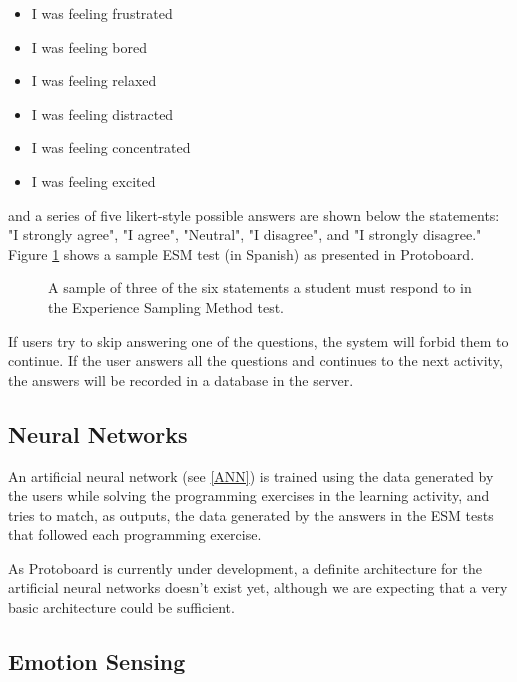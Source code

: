 \documentclass{acm_proc_article-sp}
\begin{document}
\begin{itemize}
  \item I was feeling frustrated
  \item I was feeling bored
  \item I was feeling relaxed
  \item I was feeling distracted
  \item I was feeling concentrated
  \item I was feeling excited
\end{itemize}

and a series of five likert-style possible answers are shown below the
statements: "I strongly agree", "I agree", "Neutral", "I disagree",
and "I strongly disagree." Figure \ref{fig:ESM-test} shows a sample
ESM test (in Spanish) as presented in Protoboard.

\begin{figure}
  \centering
  \caption{A sample of three of the six statements a student must
    respond to in the Experience Sampling Method test.}
  \label{fig:ESM-test}
\end{figure}

If users try to skip answering one of the questions, the system
will forbid them to continue. If the user answers all the questions
and continues to the next activity, the answers will be recorded in a
database in the server.


\subsection{Neural Networks}

An artificial neural network (see \ref{ANN}) is trained using the data generated
by the users while solving the programming exercises in the learning
activity, and tries to match, as outputs, the data generated by the
answers in the ESM tests that followed each programming exercise.

As Protoboard is currently under development, a definite architecture
for the artificial neural networks doesn't exist yet, although we are
expecting that a very basic architecture could be sufficient.


\subsection{Emotion Sensing}
\end{document}
